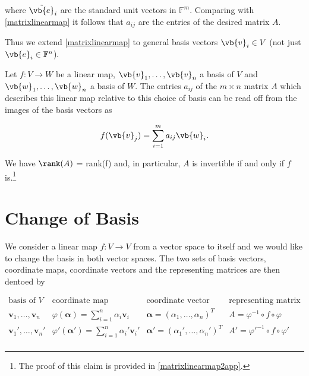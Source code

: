 \documentclass[a4paper,12pt]{report}
\begin{document}
where \(\tilde{\vb{e} }_{i}  \) are the standard unit vectors in \(\mathbb{F}^{m} \). Comparing with \cref{matrixlinearmap} it follows that \(a_{ij} \) are the entries of the desired matrix \(A\).

Thus we extend \cref{matrixlinearmap} to general basis vectors \(\vb{v}_{i}  \in  V\) (not just \(\vb{e} _{i} \in \mathbb{F}^{n}\)).   

\begin{lemma} \label{matrixlinearmap2} 
Let \(f:V \rightarrow W\) be a linear map, \(\vb{v}_{1}, \ldots, \vb{v}_n \) a basis of \(V\) and \(\vb{w}_{1}, \ldots, \vb{w}_n \) a basis of \(W\). The entries \(a_{ij} \) of the \(m \times n\) matrix \(A\) which describes this linear map relative to this choice of basis can be read off from the images of the basis vectors as 

\begin{equation}
    f(\vb{v} _{j} ) = \sum_{i=1}^{m} a_{ij}\vb{w} _{i} . 
\end{equation}

We have \(\rank (A)\) = rank(f) and, in particular, \(A\) is invertible if and only if \(f\) is.\footnote{The proof of this claim is provided in \cref{matrixlinearmap2app}.} 

\end{lemma}

\section{Change of Basis} \label{basischange} 

We consider a linear map \(f:V \rightarrow V\) from a vector space to itself and we would like to change the basis in both vector spaces. The two sets of basis vectors, coordinate maps, coordinate vectors and the representing matrices are then dentoed by

\begin{equation}
\begin{array}{cccc}
\text{basis of } V & \text{coordinate map} & \text{coordinate vector} & \text{representing matrix} \\[10pt]
\bm{v}_1, \ldots, \bm{v}_n & \varphi(\boldsymbol{\alpha } ) = \sum_{i=1}^n \alpha_i \bm{v}_i & \bm{\alpha} = (\alpha_1, \ldots, \alpha_n)^T & A = \varphi^{-1} \circ f \circ \varphi \\[15pt]
\bm{v}_1', \ldots, \bm{v}_n' & \varphi'(\boldsymbol{\alpha }' ) = \sum_{i=1}^n \alpha_i' \bm{v}_i' & \bm{\alpha}' = (\alpha_1', \ldots, \alpha_n')^T & A' = \varphi'^{-1} \circ f \circ \varphi' \\[10pt]
\end{array}
\end{equation}
\end{document}
